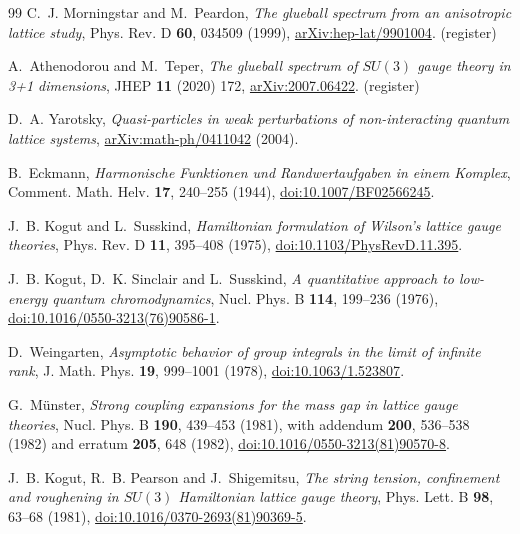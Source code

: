 \documentclass[11pt]{article}
\theoremstyle{plain}
\theoremstyle{definition}
\theoremstyle{remark}
\begin{document}
\begin{thebibliography}{99}
 C.~J. Morningstar and M.~Peardon,
  \emph{The glueball spectrum from an anisotropic lattice study},
  Phys. Rev. D \textbf{60}, 034509 (1999),
  \href{https://arxiv.org/abs/hep-lat/9901004}{arXiv:hep-lat/9901004}.
  (register)

 A.~Athenodorou and M.~Teper,
  \emph{The glueball spectrum of $SU(3)$ gauge theory in 3+1 dimensions},
  JHEP \textbf{11} (2020) 172,
  \href{https://arxiv.org/abs/2007.06422}{arXiv:2007.06422}. (register)

 D.~A. Yarotsky,
  \emph{Quasi-particles in weak perturbations of non-interacting quantum
  lattice systems}, \href{https://arxiv.org/abs/math-ph/0411042}%
  {arXiv:math-ph/0411042} (2004).

 B.~Eckmann,
  \emph{Harmonische Funktionen und Randwertaufgaben in einem Komplex},
  Comment. Math. Helv. \textbf{17}, 240--255 (1944),
  \href{https://doi.org/10.1007/BF02566245}{doi:10.1007/BF02566245}.

 J.~B. Kogut and L.~Susskind,
  \emph{Hamiltonian formulation of Wilson's lattice gauge theories},
  Phys. Rev. D \textbf{11}, 395--408 (1975),
  \href{https://doi.org/10.1103/PhysRevD.11.395}{doi:10.1103/PhysRevD.11.395}.

 J.~B. Kogut, D.~K. Sinclair and L.~Susskind,
  \emph{A quantitative approach to low-energy quantum chromodynamics},
  Nucl. Phys. B \textbf{114}, 199--236 (1976),
  \href{https://doi.org/10.1016/0550-3213(76)90586-1}{doi:10.1016/0550-3213(76)90586-1}.

 D.~Weingarten,
  \emph{Asymptotic behavior of group integrals in the limit of infinite rank},
  J. Math. Phys. \textbf{19}, 999--1001 (1978),
  \href{https://doi.org/10.1063/1.523807}{doi:10.1063/1.523807}.

 G.~M\"unster,
  \emph{Strong coupling expansions for the mass gap in lattice gauge theories},
  Nucl. Phys. B \textbf{190}, 439--453 (1981), with addendum
  \textbf{200}, 536--538 (1982) and erratum \textbf{205}, 648 (1982),
  \href{https://doi.org/10.1016/0550-3213(81)90570-8}{doi:10.1016/0550-3213(81)90570-8}.

 J.~B. Kogut, R.~B. Pearson and J.~Shigemitsu,
  \emph{The string tension, confinement and roughening in $SU(3)$ Hamiltonian
  lattice gauge theory}, Phys. Lett. B \textbf{98}, 63--68 (1981),
  \href{https://doi.org/10.1016/0370-2693(81)90369-5}{doi:10.1016/0370-2693(81)90369-5}.


\end{thebibliography}
\end{document}
